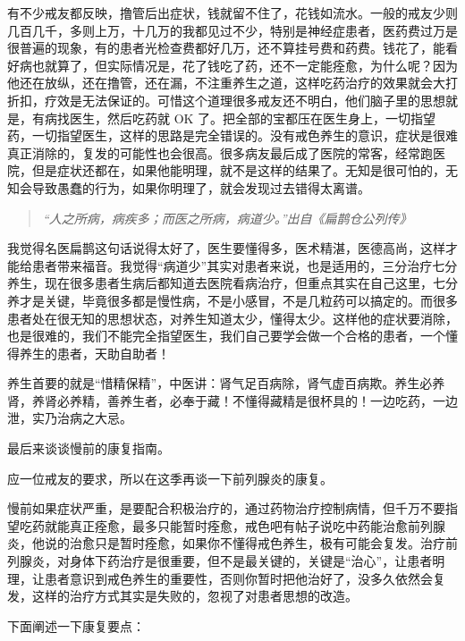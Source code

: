 \documentclass[fontset=founder]{ctexart}
\begin{document}
有不少戒友都反映，撸管后出症状，钱就留不住了，花钱如流水。一般的戒友少则几百几千，多则上万，十几万的我都见过不少，特别是神经症患者，医药费过万是很普遍的现象，有的患者光检查费都好几万，还不算挂号费和药费。钱花了，能看好病也就算了，但实际情况是，花了钱吃了药，还不一定能痊愈，为什么呢？因为他还在放纵，还在撸管，还在漏，不注重养生之道，这样吃药治疗的效果就会大打折扣，疗效是无法保证的。可惜这个道理很多戒友还不明白，他们脑子里的思想就是，有病找医生，然后吃药就 OK 了。把全部的宝都压在医生身上，一切指望药，一切指望医生，这样的思路是完全错误的。没有戒色养生的意识，症状是很难真正消除的，复发的可能性也会很高。很多病友最后成了医院的常客，经常跑医院，但是症状还都在，如果他能明理，就不是这样的结果了。无知是很可怕的，无知会导致愚蠢的行为，如果你明理了，就会发现过去错得太离谱。

\begin{quote}\it
    “人之所病，病疾多；而医之所病，病道少。”出自《扁鹊仓公列传》
\end{quote}

我觉得名医扁鹊这句话说得太好了，医生要懂得多，医术精湛，医德高尚，这样才能给患者带来福音。我觉得“病道少”其实对患者来说，也是适用的，三分治疗七分养生，现在很多患者生病后都知道去医院看病治疗，但重点其实在自己这里，七分养才是关键，毕竟很多都是慢性病，不是小感冒，不是几粒药可以搞定的。而很多患者处在很无知的思想状态，对养生知道太少，懂得太少。这样他的症状要消除，也是很难的，我们不能完全指望医生，我们自己要学会做一个合格的患者，一个懂得养生的患者，天助自助者！

养生首要的就是“惜精保精”，中医讲：肾气足百病除，肾气虚百病欺。养生必养肾，养肾必养精，善养生者，必奉于藏！不懂得藏精是很杯具的！一边吃药，一边泄，实乃治病之大忌。

最后来谈谈慢前的康复指南。

应一位戒友的要求，所以在这季再谈一下前列腺炎的康复。

慢前如果症状严重，是要配合积极治疗的，通过药物治疗控制病情，但千万不要指望吃药就能真正痊愈，最多只能暂时痊愈，戒色吧有帖子说吃中药能治愈前列腺炎，他说的治愈只是暂时痊愈，如果你不懂得戒色养生，极有可能会复发。治疗前列腺炎，对身体下药治疗是很重要，但不是最关键的，关键是“治心”，让患者明理，让患者意识到戒色养生的重要性，否则你暂时把他治好了，没多久依然会复发，这样的治疗方式其实是失败的，忽视了对患者思想的改造。

下面阐述一下康复要点：
\end{document}
